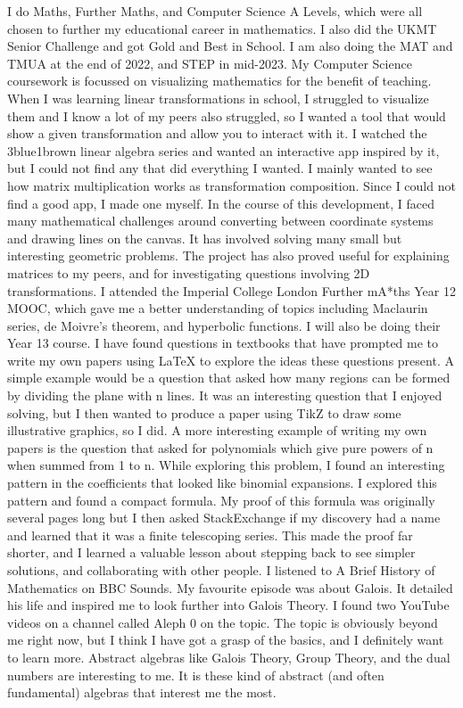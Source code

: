 \documentclass[a4paper, 12pt]{article}
\newenvironment{personalstatement}{\directlua{startPersonalStatement()}}{\directlua{stopPersonalStatement()}}
\begin{document}
\begin{personalstatement}
I do Maths, Further Maths, and Computer Science A Levels, which were all chosen to further my educational career in mathematics. I also did the UKMT Senior Challenge and got Gold and Best in School. I am also doing the MAT and TMUA at the end of 2022, and STEP in mid-2023.
My Computer Science coursework is focussed on visualizing mathematics for the benefit of teaching. When I was learning linear transformations in school, I struggled to visualize them and I know a lot of my peers also struggled, so I wanted a tool that would show a given transformation and allow you to interact with it. I watched the 3blue1brown linear algebra series and wanted an interactive app inspired by it, but I could not find any that did everything I wanted. I mainly wanted to see how matrix multiplication works as transformation composition. Since I could not find a good app, I made one myself. In the course of this development, I faced many mathematical challenges around converting between coordinate systems and drawing lines on the canvas. It has involved solving many small but interesting geometric problems. The project has also proved useful for explaining matrices to my peers, and for investigating questions involving 2D transformations.
I attended the Imperial College London Further mA*ths Year 12 MOOC, which gave me a better understanding of topics including Maclaurin series, de Moivre's theorem, and hyperbolic functions. I will also be doing their Year 13 course.
I have found questions in textbooks that have prompted me to write my own papers using LaTeX to explore the ideas these questions present. A simple example would be a question that asked how many regions can be formed by dividing the plane with n lines. It was an interesting question that I enjoyed solving, but I then wanted to produce a paper using TikZ to draw some illustrative graphics, so I did. A more interesting example of writing my own papers is the question that asked for polynomials which give pure powers of n when summed from 1 to n. While exploring this problem, I found an interesting pattern in the coefficients that looked like binomial expansions. I explored this pattern and found a compact formula. My proof of this formula was originally several pages long but I then asked StackExchange if my discovery had a name and learned that it was a finite telescoping series. This made the proof far shorter, and I learned a valuable lesson about stepping back to see simpler solutions, and collaborating with other people.
I listened to A Brief History of Mathematics on BBC Sounds. My favourite episode was about Galois. It detailed his life and inspired me to look further into Galois Theory. I found two YouTube videos on a channel called Aleph 0 on the topic. The topic is obviously beyond me right now, but I think I have got a grasp of the basics, and I definitely want to learn more. Abstract algebras like Galois Theory, Group Theory, and the dual numbers are interesting to me. It is these kind of abstract (and often fundamental) algebras that interest me the most.

\end{personalstatement}
\end{document}
